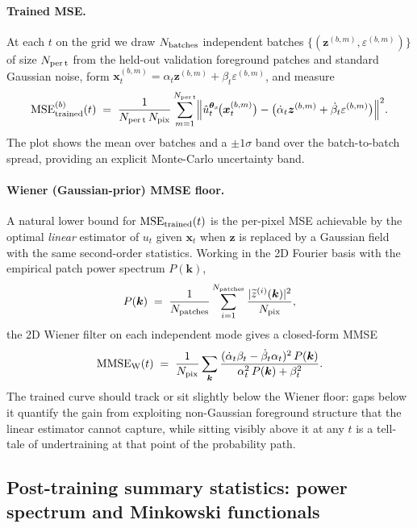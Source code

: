 \documentclass[11pt]{article}
\DeclareRobustCommand{\xvec}{\bm{x}}
\DeclareRobustCommand{\zvec}{\bm{z}}
\DeclareRobustCommand{\thetavec}{\bm{\theta}}
\theoremstyle{definition}
\begin{document}
\paragraph{Trained MSE.}
At each $t$ on the grid we draw $N_{\rm batches}$ independent batches
$\{(\zvec^{(b,m)}, \varepsilon^{(b,m)})\}$ of size $N_{\rm per\,t}$ from the
held-out validation foreground patches and standard Gaussian noise,
form $\xvec_t^{(b,m)}=\alpha_t\zvec^{(b,m)}+\beta_t\varepsilon^{(b,m)}$,
and measure
\begin{equation}
  \mathrm{MSE}_{\rm trained}^{(b)}(t)
  \;=\;
  \frac{1}{N_{\rm per\,t}\,N_{\rm pix}}
  \sum_{m=1}^{N_{\rm per\,t}}
  \Bigl\|
    \hat u_t^{\thetavec_x}\!\bigl(\xvec_t^{(b,m)}\bigr)
    -
    \bigl(\dot\alpha_t\zvec^{(b,m)}+\dot\beta_t\varepsilon^{(b,m)}\bigr)
  \Bigr\|^2.
\end{equation}
The plot shows the mean over batches and a $\pm1\sigma$ band over the
batch-to-batch spread, providing an explicit Monte-Carlo uncertainty band.

\paragraph{Wiener (Gaussian-prior) MMSE floor.}
A natural lower bound for $\mathrm{MSE}_{\rm trained}(t)$ is the per-pixel
MSE achievable by the optimal \emph{linear} estimator of $u_t$ given
$\xvec_t$ when $\zvec$ is replaced by a Gaussian field with the same
second-order statistics. Working in the 2D Fourier basis with the
empirical patch power spectrum $P(\bm k)$,
\begin{equation}
  P(\bm k)
  \;=\;
  \frac{1}{N_{\rm patches}}\sum_{i=1}^{N_{\rm patches}}
    \frac{|\widetilde z^{(i)}(\bm k)|^2}{N_{\rm pix}},
\end{equation}
the 2D Wiener filter on each independent mode gives a closed-form MMSE
\begin{equation}
  \mathrm{MMSE}_{\rm W}(t)
  \;=\;
  \frac{1}{N_{\rm pix}}\sum_{\bm k}
    \frac{(\dot\alpha_t\beta_t-\dot\beta_t\alpha_t)^2\,P(\bm k)}
         {\alpha_t^2\,P(\bm k)+\beta_t^2}.
\end{equation}
The trained curve should track or sit slightly below the Wiener floor:
gaps below it quantify the gain from exploiting non-Gaussian foreground
structure that the linear estimator cannot capture, while sitting
visibly above it at any $t$ is a tell-tale of undertraining at that
point of the probability path.

\subsection{Post-training summary statistics: power spectrum and Minkowski
functionals}
\label{sec:fg_summary_stats}
\end{document}
